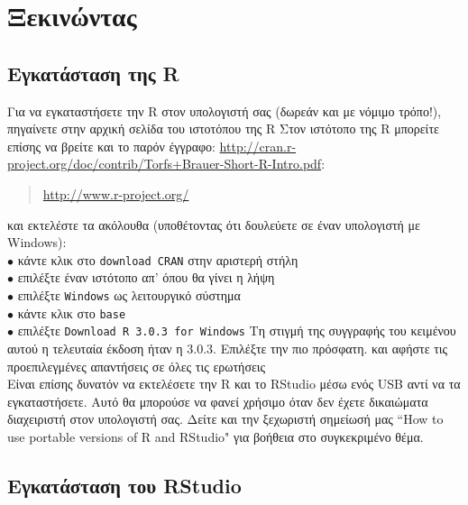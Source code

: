 \documentclass[a4paper,10pt,twocolumn]{article}
\makeatletter
\let\SF@@footnote\footnote
\def\footnote{\ifx\protect\@typeset@protect
 \expandafter\SF@@footnote
 \else
 \expandafter\SF@gobble@opt
 \fi
}
\edef\SF@gobble@opt{\noexpand\protect
 \expandafter\noexpand\csname SF@gobble@opt \endcsname}
\makeatother
\begin{document}
\section{Ξεκινώντας}

\subsection{Εγκατάσταση της R}

Για να εγκαταστήσετε την R στον υπολογιστή σας (δωρεάν και με νόμιμο τρόπο!), πηγαίνετε στην
αρχική σελίδα του ιστοτόπου της R\footnote{Στον ιστότοπο της R μπορείτε επίσης να βρείτε και το παρόν έγγραφο:
\url{http://cran.r-project.org/doc/contrib/Torfs+Brauer-Short-R-Intro.pdf}}:
\begin{quote}
  \url{http://www.r-project.org/}
\end{quote}
και εκτελέστε τα ακόλουθα (υποθέτοντας ότι δουλεύετε σε έναν υπολογιστή με Windows):\\
\noindent $\bullet$ κάντε κλικ στο \texttt{download CRAN} στην αριστερή στήλη\\
\noindent $\bullet$ επιλέξτε έναν ιστότοπο  απ' όπου θα γίνει η λήψη\\
\noindent $\bullet$ επιλέξτε \texttt{Windows} ως λειτουργικό σύστημα\\
\noindent $\bullet$ κάντε κλικ στο \texttt{base}\\
\noindent $\bullet$ επιλέξτε \texttt{Download R 3.0.3 for Windows} \footnote{Τη στιγμή της
συγγραφής του κειμένου αυτού η τελευταία έκδοση ήταν η 3.0.3. Επιλέξτε την πιο πρόσφατη.} και
αφήστε τις προεπιλεγμένες απαντήσεις σε όλες τις ερωτήσεις\\

Είναι επίσης δυνατόν να εκτελέσετε την R και το RStudio μέσω ενός USB αντί να τα εγκαταστήσετε. Αυτό
θα μπορούσε να φανεί χρήσιμο όταν δεν έχετε δικαιώματα διαχειριστή στον υπολογιστή σας. Δείτε και 
την ξεχωριστή σημείωσή μας ``How to use portable versions of R and RStudio" για βοήθεια στο 
συγκεκριμένο θέμα.

\subsection{Εγκατάσταση του RStudio}
\end{document}
